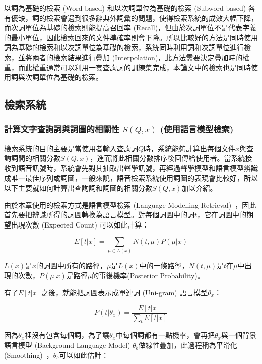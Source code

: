 以詞為基礎的檢索 (Word-based) 和以次詞單位為基礎的檢索 (Subword-based) 各有優缺，詞的檢索會遇到很多辭典外詞彙的問題，使得檢索系統的成效大幅下降，而次詞單位為基礎的檢索則能提高召回率 (Recall)，但由於次詞單位不是代表字義的最小單位，因此檢索回來的文件準確率則會下降。所以比較好的方法是同時使用詞為基礎的檢索和以次詞單位為基礎的檢索，系統同時利用詞和次詞單位進行檢索，並將兩者的檢索結果進行疊加 (Interpolation)，此方法需要決定疊加時的權重，而此權重通常可以利用一套查詢詞的訓練集完成，本論文中的檢索也是同時使用詞與次詞單位為基礎的檢索。

\subsection{檢索系統}
\subsubsection{計算文字查詢詞與詞圖的相關性 $S(Q, x)$ (使用語言模型檢索)}
\label{subsec:retrievalsystem}
檢索系統的目的主要是當使用者輸入查詢詞$Q$時，系統能夠計算出每個文件$x$與查詢詞間的相關分數$S(Q, x)$，進而將此相關分數排序後回傳給使用者。當系統接收到語音訊號時，系統會先對其抽取出聲學訊號，再經過聲學模型和語言模型辨識成唯一最佳序列或詞圖，一般來說，語音檢索系統使用詞圖的表現會比較好，所以以下主要就如何計算出查詢詞和詞圖的相關分數$S(Q, x)$加以介紹。

由於本章使用的檢索方式是語言模型檢索 (Language Modelling Retrieval)~\cite{zhai2008statistical, chia2010statistical}，因此首先要把辨識所得的詞圖轉換為語言模型。對每個詞圖中的詞$t$，它在詞圖中的期望出現次數 (Expected Count) 可以如此計算：

\begin{equation}
E[t|x] = \sum_{\mu \in L(x)} N(t, \mu)P(\mu|x)
\end{equation}

$L(x)$是$x$的詞圖中所有的路徑，$\mu$是$L(x)$中的一條路徑，$N(t, \mu)$是$t$在$\mu$中出現的次數，$P(\mu|x)$是路徑$\mu$的事後機率(Posterior Probability)。

有了$E[t|x]$之後，就能把詞圖表示成單連詞 (Uni-gram) 語言模型$\theta_x$：

\begin{equation}
P(t|\theta_x) = \frac{E[t|x]}{\sum_tE[t|x]}
\end{equation}

因為$\theta_x$裡沒有包含每個詞，為了讓$\theta_x$中每個詞都有一點機率，會再把$\theta_x$與一個背景語言模型 (Background Language Model) $\theta_b$做線性疊加，此過程稱為平滑化 (Smoothing)~\cite{zhai2001study}，$\theta_b$可以如此估計：

